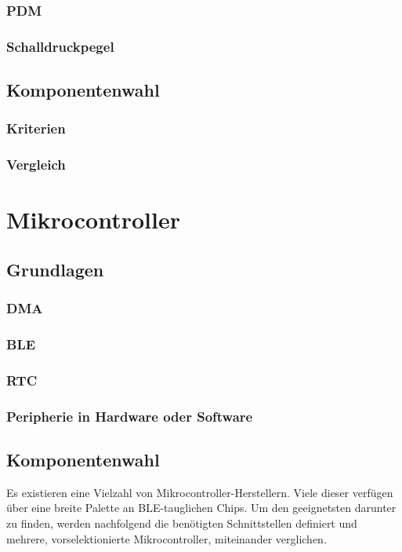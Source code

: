 \documentclass[12pt]{article}
\begin{document}
	\subsubsection{PDM}
	\subsubsection{Schalldruckpegel}
	\subsection{Komponentenwahl}
	\subsubsection{Kriterien}
	\subsubsection{Vergleich}
	
	\newpage
	\section{Mikrocontroller}
	\subsection{Grundlagen}
	\subsubsection{DMA}
	\subsubsection{BLE}
	\subsubsection{RTC}
	\subsubsection{Peripherie in Hardware oder Software}
	\subsection{Komponentenwahl}
	Es existieren eine Vielzahl von Mikrocontroller-Herstellern. Viele dieser verfügen über eine breite Palette an BLE-tauglichen Chips. Um den geeignetsten darunter zu finden, werden nachfolgend die benötigten Schnittstellen definiert und mehrere, vorselektionierte Mikrocontroller, miteinander verglichen.
\end{document}
